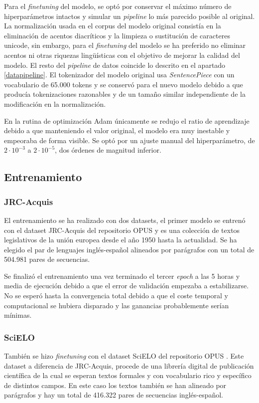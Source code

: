 Para el \textit{finetuning} del modelo, se optó por conservar el máximo número de hiperparámetros intactos y simular un \textit{pipeline} lo más parecido posible al original.
La normalización usada en el corpus del modelo original consistía en la eliminación de acentos diacríticos y la limpieza o sustitución de caracteres unicode, sin embargo, para el \textit{finetuning} del modelo se ha preferido no eliminar acentos ni otras riquezas ling{\"u}ísticas con el objetivo de mejorar la calidad del modelo. El resto del \textit{pipeline} de datos coincide lo descrito en el apartado \ref{datapipeline}.
El tokenizador del modelo original usa \textit{SentencePiece} con un vocabulario de 65.000 tokens y se conservó para el nuevo modelo debido a que producía tokenizaciones razonables y de un tamaño similar independiente de la modificación en la normalización.

En la rutina de optimización Adam \cite{Kingma2014Dec} únicamente se redujo el ratio de aprendizaje debido a que manteniendo el valor original, el modelo era muy inestable y empeoraba de forma visible. Se optó por un ajuste manual del hiperparámetro, de $2\cdot 10^{-3}$ a $2\cdot 10^{-5}$, dos órdenes de magnitud inferior.

\subsection{Entrenamiento}
\subsubsection{JRC-Acquis}
El entrenamiento se ha realizado con dos datasets, el primer modelo se entrenó con el dataset JRC-Acquis del repositorio OPUS \cite{CORPUS} y es una colección de textos legislativos de la unión europea desde el año 1950 hasta la actualidad. Se ha elegido el par de lenguajes inglés-español alineados por parágrafos con un total de 504.981 pares de secuencias.

Se finalizó el entrenamiento una vez terminado el tercer \textit{epoch} a las 5 horas y media de ejecución debido a que el error de validación empezaba a estabilizarse. No se esperó hasta la convergencia total debido a que el coste temporal y computacional se hubiera disparado y las ganancias probablemente serían mínimas.

\subsubsection{SciELO}
También se hizo \textit{finetuning} con el dataset SciELO del repositorio OPUS \cite{CORPUS}. Este dataset a diferencia de JRC-Acquis, procede de una librería digital de publicación científica de la cual se esperan textos formales y con vocabulario rico y específico de distintos campos. En este caso los textos también se han alineado por parágrafos y hay un total de 416.322 pares de secuencias inglés-español.

